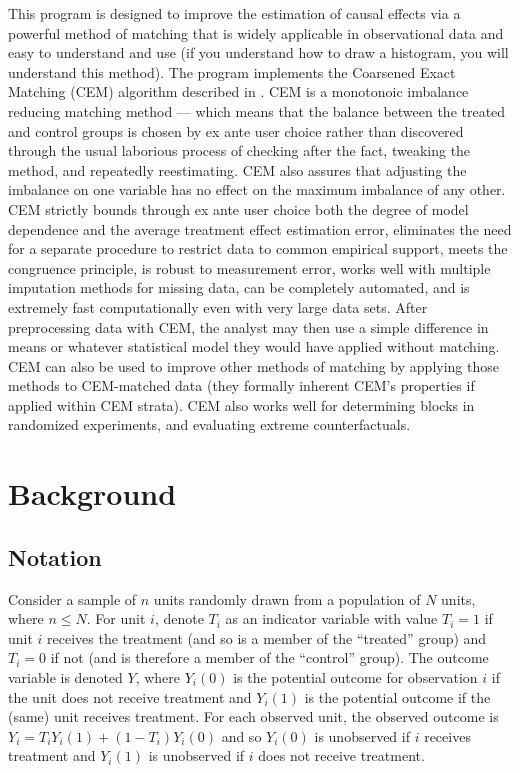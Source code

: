 \documentclass[11pt,titlepage]{article}
\begin{document}
This program is designed to improve the estimation of causal effects
via a powerful method of matching that is widely applicable in
observational data and easy to understand and use (if you understand
how to draw a histogram, you will understand this method).  The
program implements the Coarsened Exact Matching (CEM) algorithm
described in \citep{IacKinPor12}.  CEM is a monotonoic imbalance
reducing matching method --- which means that the balance between the
treated and control groups is chosen by ex ante user choice rather
than discovered through the usual laborious process of checking after
the fact, tweaking the method, and repeatedly reestimating.  CEM also
assures that adjusting the imbalance on one variable has no effect on
the maximum imbalance of any other.  CEM strictly bounds through ex
ante user choice both the degree of model dependence and the average
treatment effect estimation error, eliminates the need for a separate
procedure to restrict data to common empirical support, meets the
congruence principle, is robust to measurement error, works well with
multiple imputation methods for missing data, can be completely
automated, and is extremely fast computationally even with very large
data sets.  After preprocessing data with CEM, the analyst may then
use a simple difference in means or whatever statistical model they
would have applied without matching.  CEM can also be used to improve
other methods of matching by applying those methods to CEM-matched
data (they formally inherent CEM's properties if applied within CEM
strata).  CEM also works well for determining blocks in randomized
experiments, and evaluating extreme counterfactuals.

\section{Background}

\subsection{Notation}

Consider a sample of $n$ units  randomly drawn from a population of $N$
units, where $n \leq N$.  For unit $i$, denote $T_i$ as an indicator
variable with value $T_i=1$ if unit $i$ receives the treatment (and so
is a member of the ``treated'' group) and $T_i=0$ if not (and is
therefore a member of the ``control'' group).  The outcome variable is
denoted $Y$, where $Y_i(0)$ is the potential outcome for observation
$i$ if the unit does not receive treatment and $Y_i(1)$ is the
potential outcome if the (same) unit receives treatment.  For each
observed unit, the observed outcome is $Y_i = T_i Y_i(1) + (1-T_i)
Y_i(0)$ and so $Y_i(0)$ is unobserved if $i$ receives treatment and
$Y_i(1)$ is unobserved if $i$ does not receive treatment.
\end{document}
